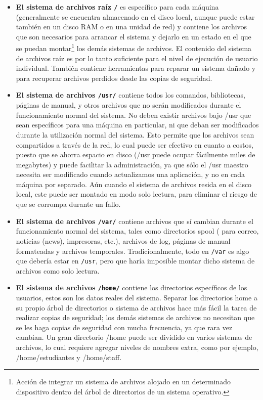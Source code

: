 \documentclass[12pt]{article}
\begin{document}
\begin{itemize} 
\item{ \textbf{El sistema de archivos raíz \texttt{/}} es específico para
cada máquina (generalmente se encuentra almacenado en el disco local, aunque
puede estar también en un disco RAM o en una unidad de red) y contiene los
archivos que son necesarios para arrancar el sistema y dejarlo en un estado en
el que se puedan montar\footnote{Acción de integrar un sistema de archivos 
alojado en un determinado dispositivo dentro del árbol de directorios de un 
sistema operativo.} los demás sistemas 
de archivos. El contenido del sistema
de archivos raíz es por lo tanto suficiente para el nivel de ejecución de
usuario individual. También contiene herramientas para reparar un sistema dañado
y para recuperar archivos perdidos desde las copias de seguridad.
}

\item{ \textbf{El sistema de archivos \texttt{/usr/}}  contiene todos los comandos,
bibliotecas, páginas de manual, y otros archivos que no serán modificados durante
el funcionamiento normal del sistema. No deben existir archivos bajo /usr que
sean específicos para una máquina en particular, ni que deban ser modificados
durante la utilización normal del sistema. Esto permite que los archivos sean
compartidos a través de la red, lo cual puede ser efectivo en cuanto a costos,
puesto que se ahorra espacio en disco (/usr puede ocupar
fácilmente miles de megabytes) y puede facilitar la administración, ya que sólo
el /usr maestro necesita ser modificado cuando actualizamos una aplicación, y no
en cada máquina por separado. Aún cuando el sistema de archivos resida en el
disco local, este puede ser montado en modo solo lectura, para eliminar el
riesgo de que se corrompa durante un fallo.  }

\item{  \textbf{El sistema de archivos \texttt{/var/}}  contiene
archivos que sí cambian durante el funcionamiento normal del sistema, tales como
directorios spool ( para correo, noticias (news), impresoras, etc.), archivos de
log, páginas de manual formateadas y archivos temporales. Tradicionalmente,
todo en \texttt{/var} es algo que debería estar en
\texttt{/usr}, pero que haría imposible montar dicho
sistema de archivos como solo lectura. }

\item{ \textbf{El sistema de archivos \texttt{/home/}}  contiene los directorios
específicos de los usuarios, estos son los datos reales del sistema. Separar
los directorios home a su propio árbol de directorios o sistema de archivos hace
más fácil la tarea de realizar copias de seguridad; los demás sistemas de
archivos no necesitan que se les haga copias de seguridad con mucha frecuencia, 
ya que rara vez cambian. Un gran directorio /home puede ser
dividido en varios sistemas de archivos, lo cual requiere agregar niveles de
nombres extra, como por ejemplo, /home/estudiantes y /home/staff.
}
\end{itemize}
\end{document}
